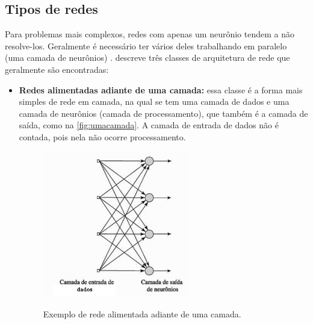\subsection{Tipos de redes}
Para problemas mais complexos, redes com apenas um neurônio tendem a não resolve-los. Geralmente é necessário ter vários deles trabalhando em paralelo (uma camada de neurônios) \cite{Demuth:2014:NND:2721661}. \cite{haykin2001} descreve três classes de arquitetura de rede que geralmente são encontradas:
\begin{itemize}
\item \textbf{Redes alimentadas adiante de uma camada:} essa classe é a forma mais simples de rede em camada, na qual se tem uma camada de dados e uma camada de neurônios (camada de processamento), que também é a camada de saída, como na \autoref{fig:umacamada}. A camada de entrada de dados não é contada, pois nela não ocorre processamento.
\begin{figure}[H]
  \centering
  \caption{Exemplo de rede alimentada adiante de uma camada.}
  \includegraphics[width=180pt]{dados/figuras/uma_camada}
  \label{fig:umacamada}
\end{figure}


\end{itemize}
